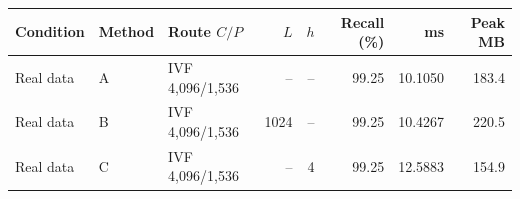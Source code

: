 \begin{tabular}{@{}lllrrrrr@{}}
\toprule
Condition & Method & Route $C/P$ & $L$ & $h$ & Recall (\%) & ms & Peak MB \\
\midrule
Real data & A & IVF 4,096/1,536 & -- & -- & 99.25 & 10.1050 & 183.4 \\
Real data & B & IVF 4,096/1,536 & 1024 & -- & 99.25 & 10.4267 & 220.5 \\
Real data & C & IVF 4,096/1,536 & -- & 4 & 99.25 & 12.5883 & 154.9 \\
\bottomrule
\end{tabular}
